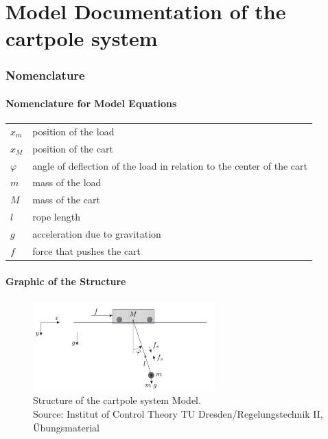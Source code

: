 \documentclass[10pt,a4paper]{article}
\begin{document}
	\part*{Model Documentation of the \\ cartpole system} %


	\section{Nomenclature} %
	\subsection{Nomenclature for Model Equations} %

	\begin{tabular}{ll}
		$x_m$ & position of the load \\
		$x_M$ & position of the cart \\
		$\varphi$ & angle of deflection of the load in relation to the center of the cart\\
		$m$ & mass of the load \\
		$M$ & mass of the cart \\
		$l$ & rope length \\
		$g$ & acceleration due to gravitation \\
		$f$ & force that pushes the cart \\

	\end{tabular}

	\subsection{Graphic of the Structure}
	\begin{figure}[H]
		\centering
		\captionsetup{justification=centering, margin=1cm}
		\includegraphics[width=70mm]{cartpole_system.pdf}
		\caption{Structure of the cartpole system Model. \\ \footnotesize{Source: Institut of Control Theory TU Dresden/Regelungstechnik II, Übungsmaterial}}
	\end{figure}
\end{document}
